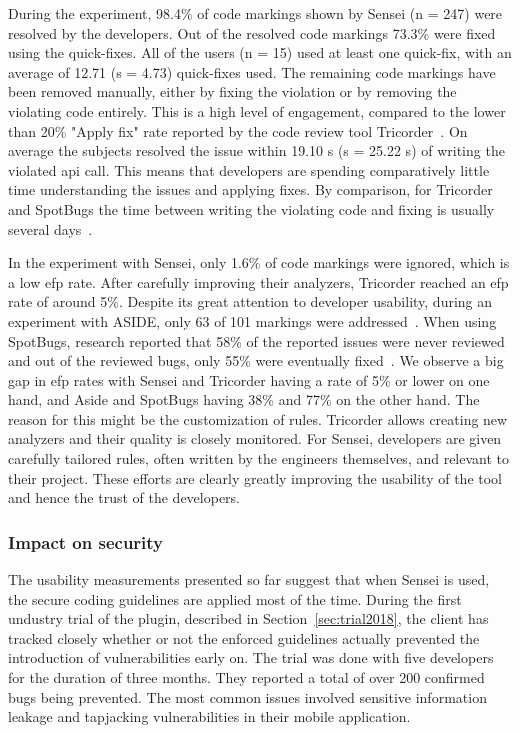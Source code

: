 During the experiment, 98.4\% of code markings shown by Sensei (n = 247) were resolved by the developers.
Out of the resolved code markings 73.3\% were fixed using the quick-fixes.
All of the users (n = 15) used at least one quick-fix, with an average of 12.71 (s = 4.73) quick-fixes used.
The remaining code markings have been removed manually, either by fixing the violation or by removing the violating code entirely.
This is a high level of engagement, compared to the lower than 20\% "Apply fix" rate reported by the code review tool Tricorder~\cite{sadowski2015tricorder}.
On average the subjects resolved the issue within 19.10 s (s = 25.22 s) of writing the violated \gls{api} call.
This means that developers are spending comparatively little time understanding the issues and applying fixes.
By comparison, for Tricorder and SpotBugs the time between writing the violating code and fixing is usually several days~\cite{sadowski2015tricorder,ayewah2007using}.

In the experiment with Sensei, only 1.6\% of code markings were ignored, which is a low \gls{efp} rate.
After carefully improving their analyzers, Tricorder reached an \gls{efp} rate of around 5\%.
Despite its great attention to developer usability, during an experiment with ASIDE, only 63 of 101 markings were addressed~\cite{xie2011aside}.
When using SpotBugs, research reported that 58\% of the reported issues were never reviewed and out of the reviewed bugs, only 55\% were eventually fixed~\cite{ayewah2007using}.
We observe a big gap in \gls{efp} rates with Sensei and Tricorder having a rate of 5\% or lower on one hand, and Aside and SpotBugs having 38\% and 77\% on the other hand.
The reason for this might be the customization of rules.
Tricorder allows creating new analyzers and their quality is closely monitored.
For Sensei, developers are given carefully tailored rules, often written by the engineers themselves, and relevant to their project.
These efforts are clearly greatly improving the usability of the tool and hence the trust of the developers.

\subsubsection{Impact on security}
The usability measurements presented so far suggest that when Sensei is used, the secure coding guidelines are applied most of the time.
During the first undustry trial of the plugin, described in Section~\ref{sec:trial2018}, the client has tracked closely whether or not the enforced guidelines actually prevented the introduction of vulnerabilities early on.
The trial was done with five developers for the duration of three months.
They reported a total of over 200 confirmed bugs being prevented.
The most common issues involved sensitive information leakage and tapjacking vulnerabilities in their mobile application.

